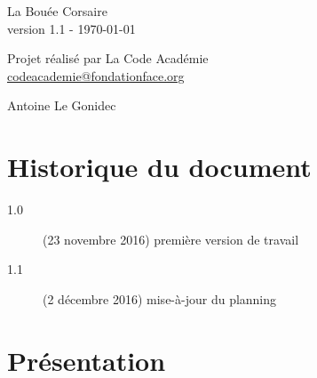\documentclass[french]{article}
\begin{document}
	
	\begin{titlepage}
		\begin{center}
			
			\vspace*{\fill}
			
			{\Huge
				La Bouée Corsaire
			}\\ [0.5cm]
			{\large
				version 1.1 - \today
			}\\
			
			\vspace*{\fill}
			
			{\Large
				Projet réalisé par La Code Académie
			}\\ [0.5cm]
			{\large
				\href{mailto:codeacademie@fondationface.org}{
					codeacademie@fondationface.org
				}
			}\\
			
			\vspace*{\fill}
			
			{\Large
				Antoine Le Gonidec
			}
			
			\vspace*{\fill}
			
		\end{center}
	\end{titlepage}
	
	\newpage
	\tableofcontents
	
	\newpage
	\section{Historique du document}
	\begin{description}
		\item [1.0] (23 novembre 2016) première version de travail
		\item [1.1] (2 décembre 2016) mise-à-jour du planning
	\end{description}
	
	\newpage
	\section{Présentation}
\end{document}
